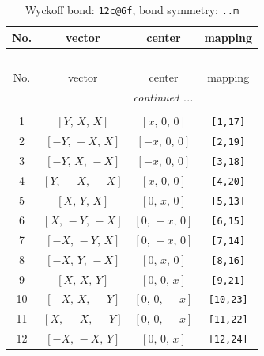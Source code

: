 \documentclass[fleqn,8pt]{jsarticle}
\begin{document}
\begin{longtable}{cccc}
\caption{Wyckoff bond: {\tt 12c@6f}, bond symmetry: {\tt ..m}}
 \\
 \hline \hline
No. & vector & center & mapping \\ \hline \endfirsthead

\multicolumn{3}{l}{\tablename\ \thetable{}} \\
 \hline \hline
No. & vector & center & mapping \\ \hline \endhead

 \hline \hline
\multicolumn{3}{r}{\footnotesize\it continued ...} \\ \endfoot

 \hline \hline
\multicolumn{3}{r}{} \\ \endlastfoot

1 & $\left[ Y,\, X,\, X \right]$ & $\left[ x,\, 0,\, 0 \right]$ & {\tt [1,17]} \\ \hline
2 & $\left[ - Y,\, - X,\, X \right]$ & $\left[ - x,\, 0,\, 0 \right]$ & {\tt [2,19]} \\ \hline
3 & $\left[ - Y,\, X,\, - X \right]$ & $\left[ - x,\, 0,\, 0 \right]$ & {\tt [3,18]} \\ \hline
4 & $\left[ Y,\, - X,\, - X \right]$ & $\left[ x,\, 0,\, 0 \right]$ & {\tt [4,20]} \\ \hline
5 & $\left[ X,\, Y,\, X \right]$ & $\left[ 0,\, x,\, 0 \right]$ & {\tt [5,13]} \\ \hline
6 & $\left[ X,\, - Y,\, - X \right]$ & $\left[ 0,\, - x,\, 0 \right]$ & {\tt [6,15]} \\ \hline
7 & $\left[ - X,\, - Y,\, X \right]$ & $\left[ 0,\, - x,\, 0 \right]$ & {\tt [7,14]} \\ \hline
8 & $\left[ - X,\, Y,\, - X \right]$ & $\left[ 0,\, x,\, 0 \right]$ & {\tt [8,16]} \\ \hline
9 & $\left[ X,\, X,\, Y \right]$ & $\left[ 0,\, 0,\, x \right]$ & {\tt [9,21]} \\ \hline
10 & $\left[ - X,\, X,\, - Y \right]$ & $\left[ 0,\, 0,\, - x \right]$ & {\tt [10,23]} \\ \hline
11 & $\left[ X,\, - X,\, - Y \right]$ & $\left[ 0,\, 0,\, - x \right]$ & {\tt [11,22]} \\ \hline
12 & $\left[ - X,\, - X,\, Y \right]$ & $\left[ 0,\, 0,\, x \right]$ & {\tt [12,24]} \\
\end{longtable}
\renewcommand{\arraystretch}{1.2}
\end{document}
